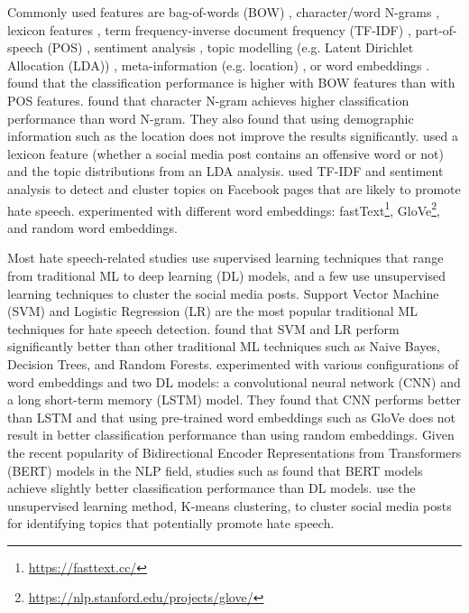 %
Commonly used features are bag-of-words (BOW) \citep{greevy2004classifying}, character/word N-grams \citep{waseem2016hateful}, lexicon features \citep{xiang2012detecting},  term frequency-inverse document frequency (TF-IDF) \citep{badjatiya2017deep, davidson2017automated, rodriguez2019automatic}, part-of-speech (POS) \citep{greevy2004classifying}, sentiment analysis \citep{rodriguez2019automatic}, topic modelling (e.g. Latent Dirichlet Allocation (LDA)) \citep{xiang2012detecting}, meta-information (e.g. location) \citep{waseem2016hateful}, or word embeddings \citep{badjatiya2017deep, agrawal2018deep}.
%
\citet{greevy2004classifying} found that the classification performance is higher with BOW features than with POS features.
%
\citet{waseem2016hateful} found that character N-gram achieves higher classification performance than word N-gram.
%
They also found that using demographic information such as the location does not improve the results significantly.
%
\citet{xiang2012detecting} used a lexicon feature (whether a social media post contains an offensive word or not) and the topic distributions from an LDA analysis.
%
\citet{rodriguez2019automatic} used TF-IDF and sentiment analysis to detect and cluster topics on Facebook pages that are likely to promote hate speech.
%
\citet{badjatiya2017deep} experimented with different word embeddings: fastText\footnote{\url{https://fasttext.cc/}}, GloVe\footnote{\url{https://nlp.stanford.edu/projects/glove/}}, and random word embeddings.
%

Most hate speech-related studies use supervised learning techniques that range from traditional ML to deep learning (DL) models, and a few use unsupervised learning techniques to cluster the social media posts.
%
Support Vector Machine (SVM) \citep{greevy2004classifying, xiang2012detecting,davidson2017automated} and Logistic Regression (LR) \citep{waseem2016hateful, davidson2017automated} are the most popular traditional ML techniques for hate speech detection.
%
\citet{davidson2017automated} found that SVM and LR perform significantly better than other traditional ML techniques such as Naive Bayes, Decision Trees, and Random Forests.
%
\citet{badjatiya2017deep} experimented with various configurations of word embeddings and two DL models: a convolutional neural network (CNN) and a long short-term memory (LSTM) model.
%
They found that CNN performs better than LSTM and that using pre-trained word embeddings such as GloVe does not result in better classification performance than using random embeddings.
%
Given the recent popularity of Bidirectional Encoder Representations from Transformers (BERT) models \citep{devlin2018bert} in the NLP field, studies such as \citep{alatawi2021detecting} found that BERT models achieve slightly better classification performance than DL models.
%
\citet{rodriguez2019automatic} use the unsupervised learning method, K-means clustering, to cluster social media posts for identifying topics that potentially promote hate speech.


